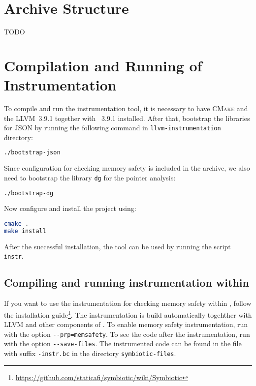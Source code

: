 
\section{Archive Structure}

TODO

\section{Compilation and Running of Instrumentation}

To compile and run the instrumentation tool, it is necessary to have
\textsc{CMake} and the LLVM~3.9.1 together with \clang~3.9.1 installed. After
that, bootstrap the libraries for JSON by running the following command in
\texttt{llvm-instrumentation} directory:

\begin{lstlisting}[language=bash]
./bootstrap-json
\end{lstlisting}

\noindent Since configuration for checking memory safety is included in the archive, we
also need to bootstrap the library \texttt{dg} for the pointer analysis:

\begin{lstlisting}[language=bash]
./bootstrap-dg
\end{lstlisting}

\noindent Now configure and install the project using:

\begin{lstlisting}[language=bash]
cmake .
make install
\end{lstlisting}

\noindent After the successful installation, the tool can be used by running the script
\texttt{instr}.


\subsection{Compiling and running instrumentation within \symbiotic}

If you want to use the instrumentation for checking memory safety within
\symbiotic, follow the \symbiotic installation
guide\footnote{\url{https://github.com/staticafi/symbiotic/wiki/Symbiotic}}.
The instrumentation is build automatically togehther with LLVM and other
components of \symbiotic. To enable memory safety instrumentation, run
\symbiotic with the option \texttt{-{}-prp=memsafety}. To see the code after
the instrumentation, run \symbiotic with the option \texttt{-{}-save-files}.
The instrumented code can be found in the file with suffix \texttt{-instr.bc}
in the directory \texttt{symbiotic-files}.

